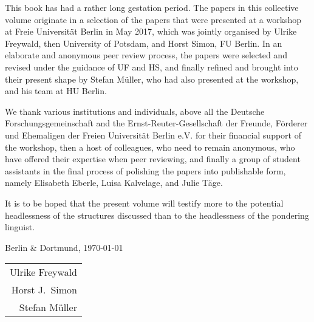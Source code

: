 
This book has had a rather long gestation period. The papers in this collective volume originate in
a selection of the papers that were presented at a workshop at Freie Universität Berlin in May
2017, which was jointly organised by Ulrike Freywald, then University of Potsdam, and Horst Simon,
FU Berlin. In an elaborate and anonymous peer review process, the papers were selected and revised
under the guidance of UF and HS, and finally refined and brought into their present shape by Stefan
Müller, who had also presented at the workshop, and his team at HU Berlin. 

We thank various institutions and individuals, above all the Deutsche Forschungsgemeinschaft and the
Ernst-Reuter-Gesellschaft der Freunde, Förderer und Ehemaligen der Freien Universität Berlin
e.V. for their financial support of the workshop, then a host of colleagues, who need to remain
anonymous, who have offered their expertise when peer reviewing, and finally a group of student
assistants in the final process of polishing the papers into publishable form, namely Elisabeth
Eberle, Luisa Kalvelage, and Julie Täge.

It is to be hoped that the present volume will testify more to the potential headlessness of the
structures discussed than to the headlessness of the pondering linguist. 

\bigskip
\noindent
Berlin \& Dortmund, \today \hfill \begin{tabular}[t]{@{}r@{}}
                                  Ulrike Freywald\\
                                  Horst J.\ Simon \\
                                  Stefan Müller
                                  \end{tabular}




